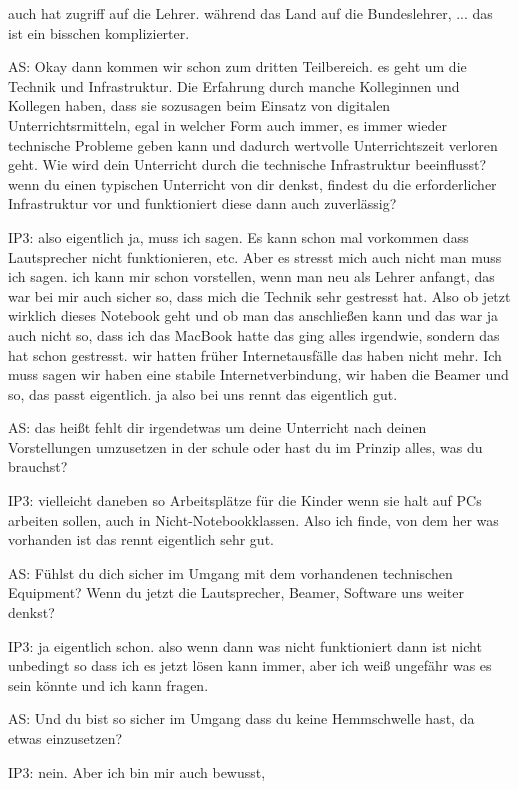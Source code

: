 \documentclass[fontsize=11pt,paper=a4]{scrbook}
\begin{document}
{\begin{itemize*}
auch hat zugriff auf die Lehrer. während
das Land  auf die Bundeslehrer, ...
das ist ein bisschen komplizierter.
\item[AS:]  Okay
dann kommen wir schon zum dritten Teilbereich. es geht um die Technik und
Infrastruktur. Die Erfahrung durch manche
Kolleginnen und Kollegen haben, dass sie
sozusagen beim Einsatz von digitalen Unterrichtsrmitteln, egal in welcher
Form auch immer, es immer wieder
technische Probleme geben kann und
dadurch wertvolle Unterrichtszeit
verloren geht. Wie wird dein Unterricht durch die technische Infrastruktur beeinflusst? wenn du
einen typischen Unterricht von dir
denkst, findest du die erforderlicher Infrastruktur vor und funktioniert diese dann  auch zuverlässig?
\item[IP3:] also eigentlich ja, muss ich sagen. Es
kann schon mal vorkommen dass
Lautsprecher nicht funktionieren, etc. Aber
es stresst mich auch nicht man muss
ich sagen. ich kann mir schon vorstellen, wenn man
neu als Lehrer anfangt, das war bei mir
auch sicher so, dass mich die Technik
sehr gestresst hat. Also ob jetzt
wirklich dieses Notebook geht und ob man
das anschließen kann und das war ja auch
nicht so, dass ich das MacBook hatte das
ging alles irgendwie, sondern das hat
schon gestresst.
wir hatten früher Internetausfälle das
haben nicht mehr. Ich muss sagen wir haben
eine stabile Internetverbindung,
wir haben die Beamer und so, das
passt eigentlich. ja also bei uns rennt
das eigentlich gut.
\item[AS:] das heißt fehlt dir irgendetwas um deine
Unterricht nach deinen Vorstellungen
umzusetzen in der schule oder hast du im Prinzip alles, was du brauchst?
\item[IP3:] vielleicht daneben so Arbeitsplätze für die Kinder
wenn sie halt auf PCs arbeiten sollen, auch in Nicht-Notebookklassen.
Also ich finde, von dem her was vorhanden
ist das rennt eigentlich sehr gut.
\item[AS:] Fühlst du dich
sicher im Umgang mit dem vorhandenen
technischen Equipment? Wenn du jetzt die
Lautsprecher, Beamer, Software uns weiter
denkst?
\item[IP3:]  ja eigentlich schon.  also wenn
dann was nicht funktioniert dann ist nicht
unbedingt so dass ich es jetzt lösen
kann immer, 
aber ich weiß ungefähr was es sein könnte
und ich kann fragen.
\item[AS:] Und du bist so sicher im Umgang dass
du keine Hemmschwelle hast, da etwas einzusetzen?
\item[IP3:] nein. Aber ich bin mir auch bewusst, 

\end{itemize*}}
\end{document}
